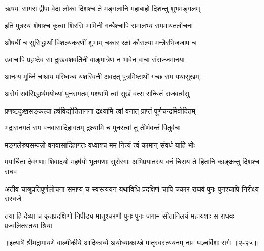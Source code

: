 \twolineshloka
{ऋषयः सागरा द्वीपा वेदा लोका दिशश्च ते}
{मङ्गलानि महाबाहो दिशन्तु शुभमङ्गलम्} %

\twolineshloka
{इति पुत्रस्य शेषाश्च कृत्वा शिरसि भामिनी}
{गन्धैश्चापि समालभ्य राममायतलोचना} %

\twolineshloka
{औषधीं च सुसिद्धार्थां विशल्यकरणीं शुभाम्}
{चकार रक्षां कौसल्या मन्त्रैरभिजजाप च} %

\twolineshloka
{उवाचापि प्रहृष्टेव सा दुःखवशवर्तिनी}
{वाङ्मात्रेण न भावेन वाचा संसज्जमानया} %

\twolineshloka
{आनम्य मूर्ध्नि चाघ्राय परिष्वज्य यशस्विनी}
{अवदत् पुत्रमिष्टार्थो गच्छ राम यथासुखम्} %

\twolineshloka
{अरोगं सर्वसिद्धार्थमयोध्यां पुनरागतम्}
{पश्यामि त्वां सुखं वत्स सन्धितं राजवर्त्मसु} %

\twolineshloka
{प्रणष्टदुःखसङ्कल्पा हर्षविद्योतितानना}
{द्रक्ष्यामि त्वां वनात् प्राप्तं पूर्णचन्द्रमिवोदितम्} %

\twolineshloka
{भद्रासनगतं राम वनवासादिहागतम्}
{द्रक्ष्यामि च पुनस्त्वां तु तीर्णवन्तं पितुर्वचः} %

\twolineshloka
{मङ्गलैरुपसम्पन्नो वनवासादिहागतः}
{वध्वाश्च मम नित्यं त्वं कामान् संवर्ध याहि भोः} %

\twolineshloka
{मयार्चिता देवगणाः शिवादयो महर्षयो भूतगणाः सुरोरगाः}
{अभिप्रयातस्य वनं चिराय ते हितानि काङ्क्षन्तु दिशश्च राघव} %

\twolineshloka
{अतीव चाश्रुप्रतिपूर्णलोचना समाप्य च स्वस्त्ययनं यथाविधि}
{प्रदक्षिणं चापि चकार राघवं पुनः पुनश्चापि निरीक्ष्य सस्वजे} %

\twolineshloka
{तया हि देव्या च कृतप्रदक्षिणो निपीड्य मातुश्चरणौ पुनः पुनः}
{जगाम सीतानिलयं महायशाः स राघवः प्रज्वलितस्तया श्रिया} %


॥इत्यार्षे श्रीमद्रामायणे वाल्मीकीये आदिकाव्ये अयोध्याकाण्डे मातृस्वस्त्ययनम् नाम पञ्चविंशः सर्गः ॥२-२५॥
